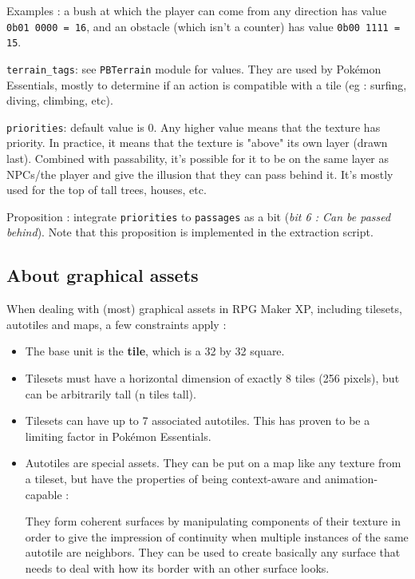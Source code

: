 \documentclass[11pt]{article}
\begin{document}
{Examples : a bush at which the player can come from any direction has value \verb|0b01 0000 = 16|, and an obstacle (which isn't a counter) has value \verb|0b00 1111 = 15|.

\verb|terrain_tags|: see \verb|PBTerrain| module for values. They are used by Pokémon Essentials, mostly to determine if an action is compatible with a tile (eg : surfing, diving, climbing, etc).


\verb|priorities|: default value is 0. Any higher value means that the texture has priority. In practice, it means that the texture is "above" its own layer (drawn last). Combined with passability, it's possible for it to be on the same layer as NPCs/the player and give the illusion that they can pass behind it. It's mostly used for the top of tall trees, houses, etc.

Proposition : integrate \verb|priorities| to \verb|passages| as a  bit (\textit{bit 6 : Can be passed behind}). Note that this proposition is implemented in the extraction script.


\subsection{About graphical assets}

When dealing with (most) graphical assets in RPG Maker XP, including tilesets, autotiles and maps, a few constraints apply :

\begin{itemize}
	\item The base unit is the \textbf{tile}, which is a 32 by 32 square.
	
	\item Tilesets must have a horizontal dimension of exactly 8 tiles (256 pixels), but can be arbitrarily tall (n tiles tall).
	
	\item Tilesets can have up to 7 associated autotiles. This has proven to be a limiting factor in Pokémon Essentials.
	
	\item Autotiles are special assets. They can be put on a map like any texture from a tileset, but have the properties of being context-aware and animation-capable :
	
	They form coherent surfaces by manipulating components of their texture in order to give the impression of continuity when multiple instances of the same autotile are neighbors. They can be used to create basically any surface that needs to deal with how its border with an other surface looks.
	

\end{itemize}}
\end{document}
